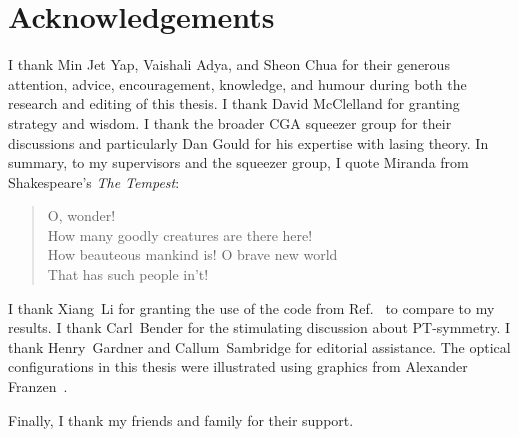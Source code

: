 \chapter*{Acknowledgements}

I thank Min Jet Yap, Vaishali Adya, and Sheon Chua for their generous attention, advice, encouragement, knowledge, and humour during both the research and editing of this thesis.
I thank David McClelland for granting strategy and wisdom.
I thank the broader CGA squeezer group for their discussions and particularly Dan Gould for his expertise with lasing theory. %
In summary, to my supervisors and the squeezer group, I quote Miranda from Shakespeare's \emph{The Tempest}:
\begin{quote}
O, wonder! \\ How many goodly creatures are there here! \\ How beauteous mankind is! O brave new world \\ That has such people in't!
\end{quote}

I thank Xiang~Li for granting the use of the code from Ref.~\cite{liBroadbandSensitivityImprovement2020} to compare to my results. I thank Carl~Bender for the stimulating discussion about PT-symmetry.
I thank Henry~Gardner and Callum~Sambridge for editorial assistance.
The optical configurations in this thesis were illustrated using graphics from Alexander Franzen~\cite{ComponentLibrary}.

Finally, I thank my friends and family for their support.


